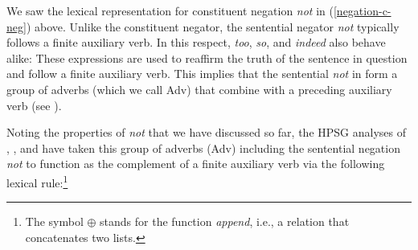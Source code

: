 \documentclass[output=paper
	        ,collection
	        ,collectionchapter
 	        ,biblatex
                ,babelshorthands
                ,newtxmath
                ,draftmode
                ,colorlinks, citecolor=brown
]{langscibook}
\begin{document}
\begin{exe}
\begin{xlist}
\begin{exe}
\begin{xlist}
We saw the lexical representation for constituent negation
\textit{not} in (\ref{negation-c-neg}) above. Unlike the
constituent negator, the sentential negator \textit{not} typically
 follows a finite auxiliary verb. In this respect,
   \textit{too}, \textit{so}, and \textit{indeed} also behave alike:
\eal
{}
\zl
%
These expressions are used to
reaffirm the truth of the sentence in question and
follow a finite auxiliary verb.  This implies
that the sentential \emph{not} in 
form a group of adverbs (which we call Adv) that combine with a
preceding auxiliary verb (see \citealt{Kim:00}).

Noting the properties of \emph{not} that we have discussed so far,
 the HPSG analyses of \citet{AG:97},
\citet{Kim:00}, and \citet{Warner2000a-u}
have taken this group of adverbs (Adv) including the sentential negation \emph{not} to function as the complement of a finite auxiliary verb via the following lexical rule:\footnote{The symbol $\oplus$ stands for the function \emph{append}, i.e., a relation that concatenates two lists.}


\end{xlist}
\end{exe}
\end{xlist}
\end{exe}
\end{document}
